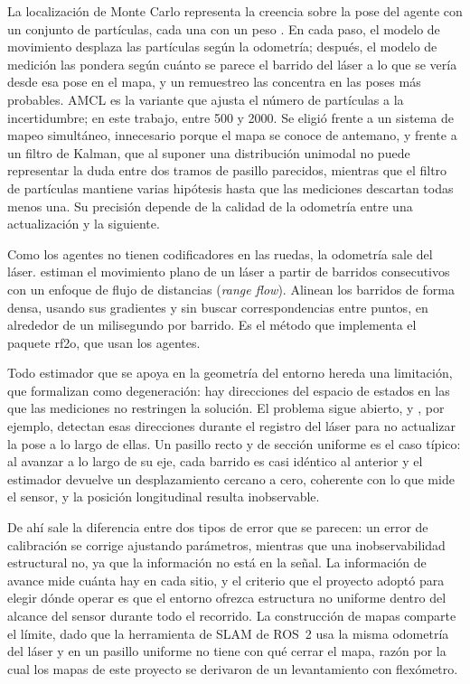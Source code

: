 La localización de Monte Carlo representa la creencia sobre la pose del agente con un conjunto de
partículas, cada una con un peso \autocite{thrun2005probabilistic}. En cada paso, el modelo de movimiento
desplaza las partículas según la odometría; después, el modelo de medición las pondera según cuánto se
parece el barrido del láser a lo que se vería desde esa pose en el mapa, y un remuestreo las concentra en
las poses más probables. AMCL es la variante que ajusta el número de partículas a la incertidumbre; en este
trabajo, entre 500 y 2000. Se eligió frente a un sistema de mapeo simultáneo, innecesario porque el mapa se
conoce de antemano, y frente a un filtro de Kalman, que al suponer una distribución unimodal no puede
representar la duda entre dos tramos de pasillo parecidos, mientras que el filtro de partículas mantiene
varias hipótesis hasta que las mediciones descartan todas menos una. Su precisión depende de la calidad de
la odometría entre una actualización y la siguiente.

Como los agentes no tienen codificadores en las ruedas, la odometría sale del
láser. \textcite{jaimez2016planar} estiman el movimiento plano de un láser a
partir de barridos consecutivos con un enfoque de flujo de distancias
(\textit{range flow}). Alinean los barridos de forma densa, usando sus
gradientes y sin buscar correspondencias entre puntos, en alrededor de un
milisegundo por barrido. Es el método que implementa el paquete rf2o, que usan
los agentes.

Todo estimador que se apoya en la geometría del entorno hereda una limitación, que
\textcite{zhang2016degeneracy} formalizan como degeneración: hay direcciones del espacio de estados en las
que las mediciones no restringen la solución. El problema sigue abierto, y \textcite{tuna2024xicp}, por
ejemplo, detectan esas direcciones durante el registro del láser para no actualizar la pose a lo largo de
ellas. Un pasillo recto y de sección uniforme es el caso típico: al avanzar a lo largo de su eje, cada barrido
es casi idéntico al anterior y el estimador devuelve un desplazamiento cercano a cero, coherente con lo que mide
el
sensor, y la posición longitudinal resulta inobservable.

De ahí sale la diferencia entre dos tipos de error que se parecen: un error de calibración se corrige ajustando
parámetros, mientras que una inobservabilidad estructural no, ya que la información no está en la señal. La
información de avance mide cuánta hay en cada sitio, y el criterio que el proyecto adoptó para elegir dónde
operar es que el entorno ofrezca estructura no uniforme dentro del alcance del sensor durante todo el recorrido.
La construcción de mapas comparte el límite, dado que la herramienta de SLAM de ROS~2
\autocite{macenski2021slam} usa la misma odometría del láser y en un pasillo uniforme no tiene con qué cerrar el
mapa, razón por la cual los mapas de este proyecto se derivaron de un levantamiento con flexómetro.

